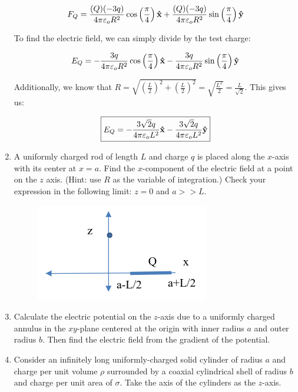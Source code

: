 \begin{enumerate}
    $$F_Q=\frac{(Q)(-3q)}{4\pi\varepsilon_o R^2}\cos\left( \frac{\pi}{4} \right)\bold{\hat{x}}+\frac{(Q)(-3q)}{4\pi\varepsilon_o R^2}\sin\left( \frac{\pi}{4} \right)\bold{\hat{y}}$$

    To find the electric field, we can simply divide by the test charge:

    $$E_Q=-\frac{3q}{4\pi\varepsilon_o R^2}\cos\left( \frac{\pi}{4} \right)\bold{\hat{x}}-\frac{3q}{4\pi\varepsilon_o R^2}\sin\left( \frac{\pi}{4} \right)\bold{\hat{y}}$$

    Additionally, we know that $R=\sqrt{\left( \frac{L}{2} \right)^2+\left( \frac{L}{2} \right)^2}=\sqrt{\frac{L^2}{2}}=\frac{L}{\sqrt{2}}$. This gives us:

    $$\boxed{E_Q=-\frac{3\sqrt{2}q}{4\pi\varepsilon_o L^2}\bold{\hat{x}}-\frac{3\sqrt{2}q}{4\pi\varepsilon_o L^2}\bold{\hat{y}}}$$

  \item A uniformly charged rod of length $L$ and charge $q$ is placed along the $x$-axis with its center at $x=a$. Find the $x$-component of the electric field at a point on the $z$ axis. (Hint: use $R$ as the variable of integration.) Check your expression in the following limit: $z=0$ and $a>>L$.

    \begin{center}
      \begin{figure}[h]
        \centering
        \includegraphics[width=.4\textwidth]{Figures/Figure2-2.png}
        \label{fig:2}
      \end{figure}
    \end{center}
    
  \item Calculate the electric potential on the $z$-axis due to a uniformly charged annulus in the $xy$-plane centered at the origin with inner radius $a$ and outer radius $b$. Then find the electric field from the gradient of the potential.
    
  \item Consider an infinitely long uniformly-charged solid cylinder of radius $a$ and charge per unit volume $\rho$ surrounded by a coaxial cylindrical shell of radius $b$ and charge per unit area of $\sigma$. Take the axis of the cylinders as the $z$-axis.


\end{enumerate}
